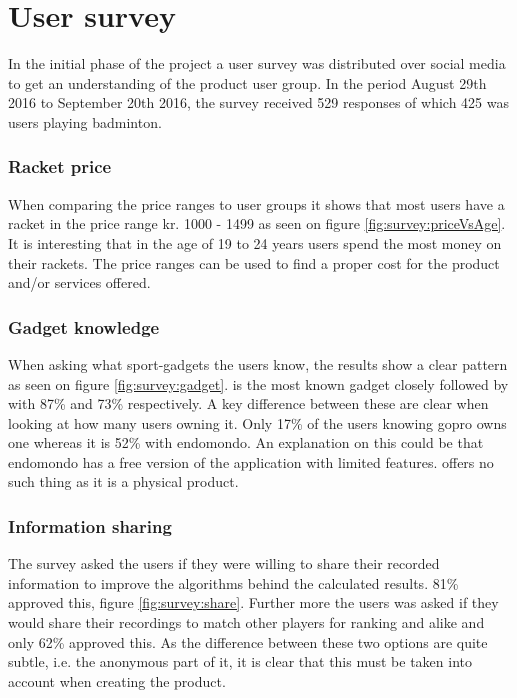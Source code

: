 \chapter{User survey}
In the initial phase of the project a user survey was distributed over social media to get an understanding of the product user group.
In the period August 29th 2016 to September 20th 2016, the survey received 529 responses of which 425 was users playing badminton.

\subsection*{Racket price}
When comparing the price ranges to user groups it shows that most users have a racket in the price range kr. 1000 - 1499 as seen on figure \ref{fig:survey:priceVsAge}.
It is interesting that in the age of 19 to 24 years users spend the most money on their rackets.
The price ranges can be used to find a proper cost for the product and/or services offered.


\subsection*{Gadget knowledge}
When asking what sport-gadgets the users know, the results show a clear pattern as seen on figure \ref{fig:survey:gadget}.
 is the most known gadget closely followed by  with 87\% and 73\% respectively.
A key difference between these are clear when looking at how many users owning it.
Only 17\% of the users knowing \gls{gopro} owns one whereas it is 52\% with \gls{endomondo}.
An explanation on this could be that \gls{endomondo} has a free version of the application with limited features.
 offers no such thing as it is a physical product.


\subsection*{Information sharing}
The survey asked the users if they were willing to share their recorded information to improve the algorithms behind the calculated results. 
81\% approved this, figure \ref{fig:survey:share}.
Further more the users was asked if they would share their recordings to match other players for ranking and alike and only 62\% approved this.
As the difference between these two options are quite subtle, i.e. the anonymous part of it, it is clear that this must be taken into account when creating the product.
 
